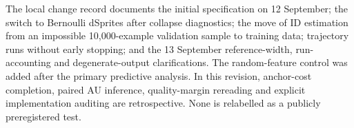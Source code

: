The local change record documents the initial specification on
12 September; the switch to Bernoulli dSprites after collapse diagnostics;
the move of ID estimation from an impossible 10,000-example validation
sample to training data; trajectory runs without early stopping; and
the 13 September reference-width, run-accounting and degenerate-output
clarifications. The random-feature control was added after the primary
predictive analysis. In this revision, anchor-cost completion, paired AU
inference, quality-margin rereading and explicit implementation auditing
are retrospective. None is relabelled as a publicly preregistered test.
